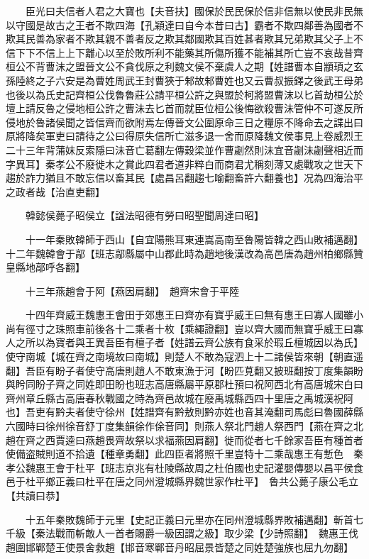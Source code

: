 　　臣光曰夫信者人君之大寶也【夫音扶】國保於民民保於信非信無以使民非民無以守國是故古之王者不欺四海【孔穎達曰自今本昔曰古】霸者不欺四鄰善為國者不欺其民善為家者不欺其親不善者反之欺其鄰國欺其百姓甚者欺其兄弟欺其父子上不信下下不信上上下離心以至於敗所利不能藥其所傷所獲不能補其所亡豈不哀哉昔齊桓公不背曹沫之盟晉文公不貪伐原之利魏文侯不棄虞人之期【姓譜曹本自顓頊之玄孫陸終之子六安是為曹姓周武王封曹狹于邾故邾曹姓也又云曹叔振鐸之後武王母弟也後以為氏史記齊桓公伐魯魯莊公請平桓公許之與盟於柯將盟曹沫以匕首劫桓公於壇上請反魯之侵地桓公許之曹沬去匕首而就臣位桓公後悔欲殺曹沬管仲不可遂反所侵地於魯諸侯聞之皆信齊而欲附焉左傳晉文公圍原命三日之糧原不降命去之諜出曰原將降矣軍吏曰請待之公曰得原失信所亡滋多退一舍而原降魏文侯事見上卷威烈王二十三年背蒲妺反索隱曰沬音亡葛翻左傳穀梁並作曹劌然則沬宜音劌沬劌聲相近而字異耳】秦孝公不廢徙木之賞此四君者道非粹白而商君尤稱刻薄又處戰攻之世天下趨於詐力猶且不敢忘信以畜其民【處昌呂翻趨七喻翻畜許六翻養也】况為四海治平之政者哉【治直吏翻】

　　韓懿侯薨子昭侯立【諡法昭德有勞曰昭聖聞周達曰昭】

　　十一年秦敗韓師于西山【自宜陽熊耳東連嵩高南至魯陽皆韓之西山敗補邁翻】十二年魏韓會于鄗【班志鄗縣屬中山郡此時為趙地後漢改為高邑唐為趙州柏鄉縣贊皇縣地鄗呼各翻】

　　十三年燕趙會于阿【燕因肩翻】　趙齊宋會于平陸

　　十四年齊威王魏惠王會田于郊惠王曰齊亦有寶乎威王曰無有惠王曰寡人國雖小尚有徑寸之珠照車前後各十二乘者十枚【乘繩證翻】豈以齊大國而無寶乎威王曰寡人之所以為寶者與王異吾臣有檀子者【姓譜云齊公族有食采於瑕丘檀城因以為氏】使守南城【城在齊之南境故曰南城】則楚人不敢為寇泗上十二諸侯皆來朝【朝直遥翻】吾臣有盼子者使守高唐則趙人不敢東漁于河【盼匹莧翻又披班翻按丁度集韻盼與盻同盼子齊之同姓即田盼也班志高唐縣屬平原郡杜預曰祝阿西北有高唐城宋白曰齊州章丘縣古高唐春秋戰國之時為齊邑故城在廢禹城縣西四十里唐之禹城漢祝阿也】吾吏有黔夫者使守徐州【姓譜齊有黔敖則黔亦姓也音其淹翻司馬彪曰魯國薛縣六國時曰徐州徐音舒丁度集韻徐作俆音同】則燕人祭北門趙人祭西門【燕在齊之北趙在齊之西賈逵曰燕趙畏齊故祭以求福燕因肩翻】徙而從者七千餘家吾臣有種首者使備盗賊則道不拾遺【種章勇翻】此四臣者將照千里豈特十二乘哉惠王有慙色　秦孝公魏惠王會于杜平【班志京兆有杜陵縣故周之杜伯國也史記灌嬰傳嬰以昌平侯食邑于杜平鄉正義曰杜平在唐之同州澄城縣界魏世家作杜平】　魯共公薨子康公毛立【共讀曰恭】

　　十五年秦敗魏師于元里【史記正義曰元里亦在同州澄城縣界敗補邁翻】斬首七千級【秦法戰而斬敵人一首者賜爵一級因謂之級】取少梁【少詩照翻】　魏惠王伐趙圍邯鄲楚王使景舍救趙【邯音寒鄲音丹昭屈景皆楚之同姓楚強族也屈九勿翻】

